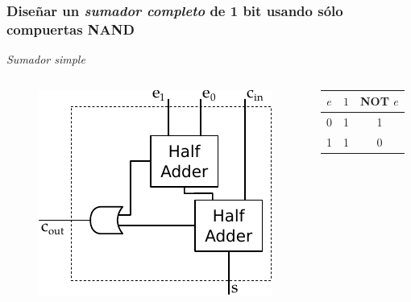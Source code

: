 \documentclass[mathserif,hyperref]{beamer}
\begin{document}
\begin{frame}[t]
\frametitle{\small Diseñar un \textit{sumador completo} de 1 bit usando sólo
compuertas NAND}
\textit{Sumador simple}
\begin{columns}[T]
  \begin{figure}[htp]
    \includegraphics[scale=0.6]{sumador-completo.pdf}
  \end{figure}
  \begin{center}\begin{tabular}{| c | c || c |}
    \hline
    $e$ & $1$ & NOT $e$ \\ \hline
     0  &  1  &    1    \\
     1  &  1  &    0    \\
    \hline
  \end{tabular}\end{center}
\end{columns}
\end{frame}
\end{document}
